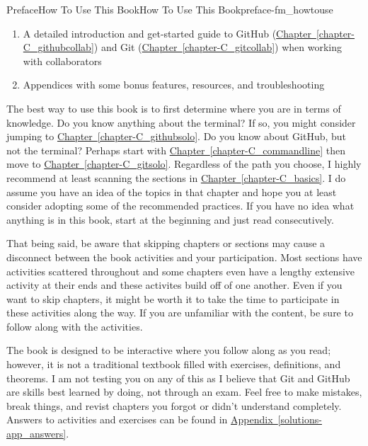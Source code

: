 \documentclass[oneside,10pt,]{book}
\newcommand{\xreffont}{\relax}
\begin{document}
\begin{preface}{Preface}{How To Use This Book}{}{How To Use This Book}{}{}{preface-fm_howtouse}
\begin{enumerate}
\item{}A detailed introduction and get-started guide to GitHub (\hyperref[chapter-C_githubcollab]{Chapter~{\xreffont\ref{chapter-C_githubcollab}}}) and Git (\hyperref[chapter-C_gitcollab]{Chapter~{\xreffont\ref{chapter-C_gitcollab}}}) when working with collaborators%
\item{}Appendices with some bonus features, resources, and troubleshooting%
\end{enumerate}
%
\par
The best way to use this book is to first determine where you are in terms of knowledge. Do you know anything about the terminal? If so, you might consider jumping to \hyperref[chapter-C_githubsolo]{Chapter~{\xreffont\ref{chapter-C_githubsolo}}}. Do you know about GitHub, but not the terminal? Perhaps start with \hyperref[chapter-C_commandline]{Chapter~{\xreffont\ref{chapter-C_commandline}}} then move to \hyperref[chapter-C_gitsolo]{Chapter~{\xreffont\ref{chapter-C_gitsolo}}}. Regardless of the path you choose, I highly recommend at least scanning the sections in \hyperref[chapter-C_basics]{Chapter~{\xreffont\ref{chapter-C_basics}}}. I do assume you have an idea of the topics in that chapter and hope you at least consider adopting some of the recommended practices. If you have no idea what anything is in this book, start at the beginning and just read consecutively.%
\par
That being said, be aware that skipping chapters or sections may cause a disconnect between the book activities and your participation. Most sections have activities scattered throughout and some chapters even have a lengthy extensive activity at their ends and these activites build off of one another. Even if you want to skip chapters, it might be worth it to take the time to participate in these activities along the way. If you are unfamiliar with the content, be sure to follow along with the activities.%
\par
The book is designed to be interactive where you follow along as you read; however, it is not a traditional textbook filled with exercises, definitions, and theorems. I am not testing you on any of this as I believe that Git and GitHub are skills best learned by doing, not through an exam. Feel free to make mistakes, break things, and revist chapters you forgot or didn't understand completely. Answers to activities and exercises can be found in \hyperref[solutions-app_answers]{Appendix~{\xreffont\ref{solutions-app_answers}}}.%
\par

\end{preface}
\end{document}
